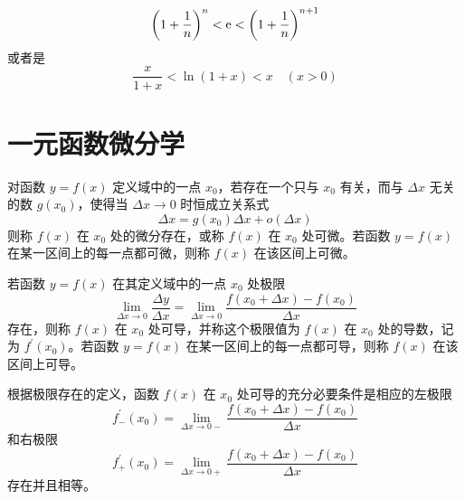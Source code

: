 \documentclass{ctexbook}
\def\e{\textnormal{e}}
\begin{document}
\begin{proposition}[自然对数的数列不等式]
    \begin{equation}
        \left(1+\frac{1}{n}\right)^n<\e<\left(1+\frac{1}{n}\right)^{n+1}
    \end{equation}
    或者是
    \begin{equation}
        \frac{x}{1+x}<\ln(1+x)<x\quad (x>0)
    \end{equation}
\end{proposition}

\chapter{一元函数微分学}

\begin{definition}[微分]
    对函数 $y=f(x)$ 定义域中的一点 $x_0$，若存在一个只与 $x_0$ 有关，而与 $\Delta x$ 无关的数 $g(x_0)$，使得当 $\Delta x\rightarrow 0$ 时恒成立关系式
    \begin{equation}
        \Delta x = g(x_0)\Delta x+o(\Delta x)
    \end{equation}
    则称 $f(x)$ 在 $x_0$ 处的微分存在，或称 $f(x)$ 在 $x_0$ 处可微。若函数 $y=f(x)$ 在某一区间上的每一点都可微，则称 $f(x)$ 在该区间上可微。
\end{definition}

\begin{definition}[导数]
    若函数 $y=f(x)$ 在其定义域中的一点 $x_0$ 处极限
    \begin{equation}
        \lim_{\Delta x\rightarrow 0}\frac{\Delta y}{\Delta x}=\lim_{\Delta x\rightarrow 0}\frac{f(x_0+\Delta x)-f(x_0)}{\Delta x}
    \end{equation}
    存在，则称 $f(x)$ 在 $x_0$ 处可导，并称这个极限值为 $f(x)$ 在 $x_0$ 处的导数，记为 $f^\prime(x_0)$。若函数 $y=f(x)$ 在某一区间上的每一点都可导，则称 $f(x)$ 在该区间上可导。
\end{definition}

\begin{definition}[单侧导数]
    根据极限存在的定义，函数 $f(x)$ 在 $x_0$ 处可导的充分必要条件是相应的左极限
    \begin{equation}
        f^\prime_{-}(x_0)=\lim_{\Delta x\rightarrow 0-}\frac{f(x_0+\Delta x)-f(x_0)}{\Delta x}
    \end{equation}
    和右极限
    \begin{equation}
        f^\prime_{+}(x_0)=\lim_{\Delta x\rightarrow 0+}\frac{f(x_0+\Delta x)-f(x_0)}{\Delta x}
    \end{equation}
    存在并且相等。
\end{definition}
\end{document}
